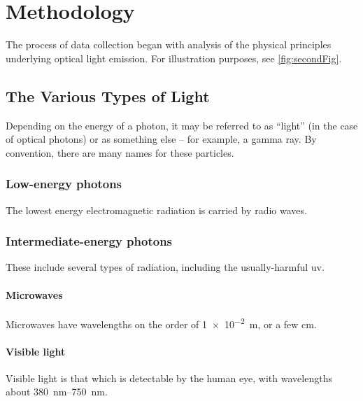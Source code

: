 
\chapter{Methodology}

The process of data collection began with analysis of the physical principles underlying optical light emission. For illustration purposes, see \ref{fig:secondFig}.

\section{The Various Types of Light}

Depending on the energy of a photon, it may be referred to as ``light'' (in the case of optical photons) or as something else -- for example, a gamma ray. By convention, there are many names for these particles.

\subsection{Low-energy photons}

The lowest energy electromagnetic radiation is carried by radio waves.

\subsection{Intermediate-energy photons}

These include several types of radiation, including the usually-harmful \gls{uv}.

\subsubsection{Microwaves}

Microwaves have wavelengths on the order of \SI{1e-2}{\meter}, or a few \si{\centi\meter}.

\subsubsection{Visible light}

Visible light is that which is detectable by the human eye, with wavelengths about \SIrange{380}{750}{\nano\meter}.

